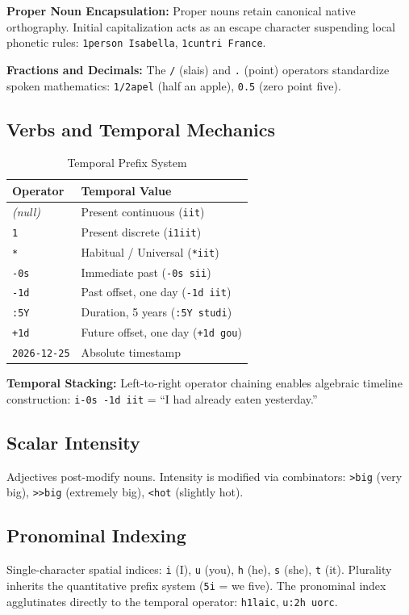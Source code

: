 \documentclass[10pt,twocolumn,letterpaper]{article}
\newcommand{\me}[1]{\texttt{#1}}
\begin{document}
\textbf{Proper Noun Encapsulation:} Proper nouns retain canonical native orthography. Initial capitalization acts as an escape character suspending local phonetic rules: \me{1person Isabella}, \me{1cuntri France}.

\textbf{Fractions and Decimals:} The \me{/} (slais) and \me{.} (point) operators standardize spoken mathematics: \me{1/2apel} (half an apple), \me{0.5} (zero point five).

\subsection{Verbs and Temporal Mechanics}

\begin{table}[h!]
\centering\small
\begin{tabularx}{\linewidth}{lX}
\toprule
\textbf{Operator} & \textbf{Temporal Value} \\
\midrule
\textit{(null)} & Present continuous (\me{iit}) \\
\me{1} & Present discrete (\me{i1iit}) \\
\me{*} & Habitual / Universal (\me{*iit}) \\
\me{-0s} & Immediate past (\me{-0s sii}) \\
\me{-1d} & Past offset, one day (\me{-1d iit}) \\
\me{:5Y} & Duration, 5 years (\me{:5Y studi}) \\
\me{+1d} & Future offset, one day (\me{+1d gou}) \\
\me{2026-12-25} & Absolute timestamp \\
\bottomrule
\end{tabularx}
\caption{Temporal Prefix System}
\end{table}

\textbf{Temporal Stacking:} Left-to-right operator chaining enables algebraic timeline construction: \me{i-0s -1d iit} = ``I had already eaten yesterday.''

\subsection{Scalar Intensity}
Adjectives post-modify nouns. Intensity is modified via combinators: \me{>big} (very big), \me{>>big} (extremely big), \me{<hot} (slightly hot).

\subsection{Pronominal Indexing}
Single-character spatial indices: \me{i} (I), \me{u} (you), \me{h} (he), \me{s} (she), \me{t} (it). Plurality inherits the quantitative prefix system (\me{5i} = we five). The pronominal index agglutinates directly to the temporal operator: \me{h1laic}, \me{u:2h uorc}.
\end{document}
